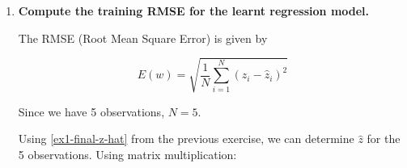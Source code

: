 \documentclass[12pt]{article}
\begin{document}
\begin{enumerate}[leftmargin=\labelsep]
    \item {\color{questioncolor}\bfseries
          Compute the training RMSE for the learnt regression model.
          }\\
          \vspace{0.5em}

          The RMSE (Root Mean Square Error) is given by

          \begin{equation}\label{ex2-rmse}
              E(w) = \sqrt{\frac{1}{N} \sum_{i = 1}^{N} (z_i - \hat{z}_i)^2}
          \end{equation}

          Since we have 5 observations, $N = 5$.

          Using \eqref{ex1-final-z-hat} from the previous exercise, we can determine
          $\hat{z}$ for the 5 observations.
          Using matrix multiplication:


\end{enumerate}
\end{document}
